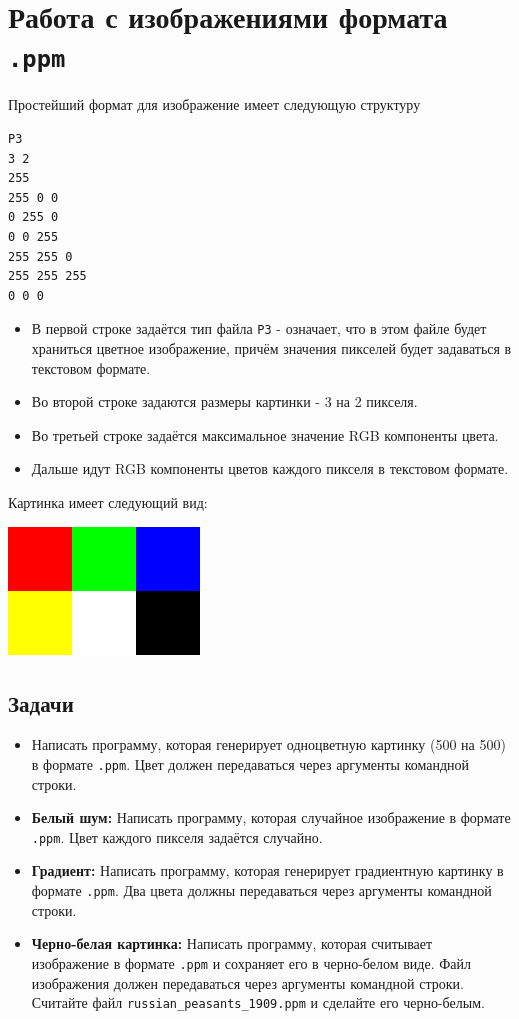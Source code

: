 \documentclass[10pt]{article}
\begin{document}
\section*{Работа с изображениями формата \texttt{.ppm}}
Простейший формат для изображение имеет следующую структуру
\begin{verbatim}
P3
3 2
255
255 0 0 
0 255 0  
0 0 255 
255 255 0 
255 255 255 
0 0 0
\end{verbatim}
\begin{itemize}
\item В первой строке задаётся тип файла \texttt{P3} - означает, что в этом файле будет храниться цветное изображение, причём значения пикселей будет задаваться в текстовом формате.
\item Во второй строке задаются размеры картинки - 3 на 2 пикселя.
\item Во третьей строке задаётся максимальное значение RGB компоненты цвета.
\item Дальше идут RGB компоненты цветов каждого пикселя в текстовом формате.
\end{itemize}
Картинка имеет следующий вид:
\begin{center}
\includegraphics[scale=0.5]{../images/tiny.png}
\end{center}

\subsection*{Задачи}
\begin{itemize}
\item Написать программу, которая генерирует одноцветную картинку (500 на 500) в формате \texttt{.ppm}. Цвет должен передаваться через аргументы командной строки.
\item \textbf{Белый шум:} Написать программу, которая случайное изображение в формате \texttt{.ppm}. Цвет каждого пикселя задаётся случайно.
\item \textbf{Градиент:} Написать программу, которая генерирует градиентную картинку в формате \texttt{.ppm}. Два цвета должны передаваться через аргументы командной строки.
\item \textbf{Черно-белая картинка:} Написать программу, которая считывает изображение в формате \texttt{.ppm} и сохраняет его в черно-белом виде. Файл изображения должен передаваться через аргументы командной строки. Считайте файл \texttt{russian\_peasants\_1909.ppm} и сделайте его черно-белым.
\end{itemize}
\end{document}
